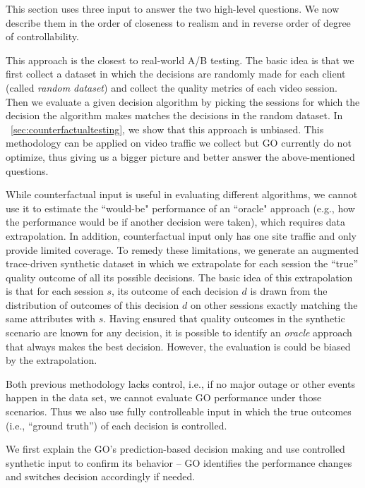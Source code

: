 This section uses three input to answer the two high-level questions. We now describe them in the order of closeness to realism and in reverse order of degree of controllability.

 This approach is the closest to real-world A/B testing. The basic idea is that we first collect a dataset in which the decisions are randomly made for each client (called {\it random dataset}) and collect the quality metrics of each video session. Then we evaluate a given decision algorithm by picking the sessions for which the decision the algorithm makes matches the decisions in the random dataset. In \Section~\ref{sec:counterfactualtesting}, we show that this approach is unbiased. This methodology can be applied on video traffic we collect but GO currently do not optimize, thus giving us a bigger picture and better answer the above-mentioned questions. 

 While counterfactual input is useful in evaluating different algorithms, we cannot use it to estimate the ``would-be" performance of an ``oracle" approach (e.g., how the performance would be if another decision were taken), which requires data extrapolation. In addition, counterfactual input only has one site traffic and only provide limited coverage. To remedy these limitations, we generate an augmented trace-driven synthetic dataset in which we extrapolate for each session the ``true'' quality outcome of all its possible decisions. The basic idea of this extrapolation  is that for each session $s$, its outcome of each decision $d$ is drawn from the distribution of outcomes of this decision $d$ on other sessions exactly matching the same attributes with $s$. Having ensured that quality outcomes in the synthetic scenario are known for any decision, it is possible to identify an {\it oracle} approach that always makes the best decision. However, the evaluation is could be biased by the extrapolation.

 Both previous methodology lacks control, i.e., if no major outage or other events happen in the data set, we cannot evaluate GO performance under those scenarios.  Thus we also use fully controlleable input in which the true outcomes (i.e., ``ground truth'') of each decision is controlled.





We first explain the GO's prediction-based decision making and use controlled synthetic input to confirm its behavior -- GO identifies the performance changes and switches decision accordingly if needed.

